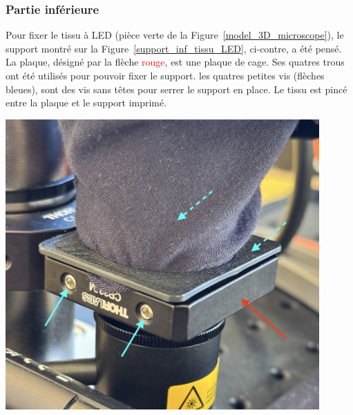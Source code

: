 \subsubsection{Partie inférieure}
\begin{minipage}[c]{0.48\textwidth}
    Pour fixer le tissu à LED (pièce \textcolor[RGB]{70, 170, 70}{verte} de la Figure~\ref{model_3D_microscope}), le support montré sur la Figure~\ref{support_inf_tissu_LED}, ci-contre, a été pensé. La plaque, désigné par la flèche \textcolor{red}{rouge}, est une plaque de cage.
    \vspace{1em}
    Ses quatres trous ont été utilisés pour pouvoir fixer le support. les quatres petites vis (flèches \textcolor[RGB]{115, 210, 210}{bleues}), sont des vis sans têtes pour serrer le support en place. Le tissu est pincé entre la plaque et le support imprimé.
\end{minipage}\hfill
\begin{minipage}[c]{0.48\textwidth}
    \begin{center}
        \includegraphics[width=0.9\textwidth]{assets/figures/Protections_laser/Securite_mecanique/Protection_vers_microscope/support_inf_tissu_LED.jpeg}
    \end{center}
    \label{support_inf_tissu_LED}
\end{minipage}

